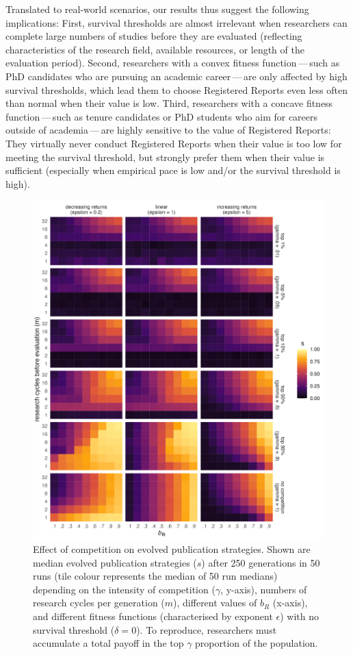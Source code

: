 \documentclass[
  ,man,mask,floatsintext]{apa6}
\begin{document}
Translated to real-world scenarios, our results thus suggest the following implications:
First, survival thresholds are almost irrelevant when
researchers can complete large numbers of studies before they are evaluated (reflecting characteristics of the research field, available resources, or length of the evaluation period).
Second, researchers with a convex fitness function\(\,\)---\(\,\)such as PhD candidates who are pursuing an academic career\(\,\)---\(\,\)are only affected by high survival thresholds, which lead them to choose Registered Reports even less often than normal when their value is low.
Third, researchers with a concave fitness function\(\,\)---\(\,\)such as tenure candidates or PhD students who aim for careers outside of academia\(\,\)---\(\,\)are highly sensitive to the value of Registered Reports:
They virtually never conduct Registered Reports when their value is too low for meeting the survival threshold, but strongly prefer them when their value is sufficient (especially when empirical pace is low and/or the survival threshold is high).



\begin{figure}
\includegraphics[width=1\linewidth]{../plots/plot_gamma_tile_evo} \caption{Effect of competition on evolved publication strategies. Shown are median evolved publication strategies (\(s\)) after 250 generations in 50 runs (tile colour represents the median of 50 run medians) depending on the intensity of competition (\(\gamma\), y-axis), numbers of research cycles per generation (\(m\)), different values of \(b_{R}\) (x-axis), and different fitness functions (characterised by exponent \(\epsilon\)) with no survival threshold (\(\delta = 0\)). To reproduce, researchers must accumulate a total payoff in the top \(\gamma\) proportion of the population.}\label{fig:gammaplot}
\end{figure}
\end{document}
